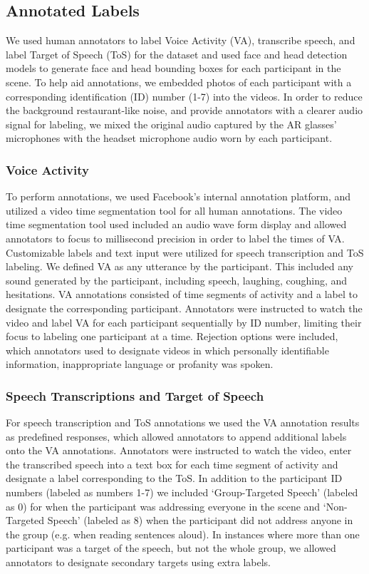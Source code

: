 \documentclass[journal]{IEEEtran}
\begin{document}
\subsection{Annotated Labels}
We used human annotators to label Voice Activity (VA), transcribe speech, and label Target of Speech (ToS) for the dataset and used face and head detection models to generate face and head bounding boxes for each participant in the scene.
To help aid annotations, we embedded photos of each participant with a corresponding identification (ID) number (1-7) into the videos.
In order to reduce the background restaurant-like noise, and provide annotators with a clearer audio signal for labeling, we mixed the original audio captured by the AR glasses' microphones with the headset microphone audio worn by each participant.



\subsubsection{Voice Activity}
To perform annotations, we used Facebook's internal annotation platform, and utilized a video time segmentation tool for all human annotations.
The video time segmentation tool used included an audio wave form display and allowed annotators to focus to millisecond precision in order to label the times of VA.
Customizable labels and text input were utilized for speech transcription and ToS labeling.
We defined VA as any utterance by the participant.
This included any sound generated by the participant, including speech, laughing, coughing, and hesitations.
VA annotations consisted of time segments of activity and a label to designate the corresponding participant.
Annotators were instructed to watch the video and label VA for each participant sequentially by ID number, limiting their focus to labeling one participant at a time.
Rejection options were included, which annotators used to designate videos in which personally identifiable information, inappropriate language or profanity was spoken.
 
 
\subsubsection{Speech Transcriptions and Target of Speech}
For speech transcription and ToS annotations we used the VA annotation results as predefined responses, which allowed annotators to append additional labels onto the VA annotations.
Annotators were instructed to watch the video, enter the transcribed speech into a text box for each time segment of activity and designate a label corresponding to the ToS.
In addition to the participant ID numbers (labeled as numbers 1-7) we included `Group-Targeted Speech' (labeled as 0) for when the participant was addressing everyone in the scene and `Non-Targeted Speech' (labeled as 8) when the participant did not address anyone in the group (e.g. when reading sentences aloud).
In instances where more than one participant was a target of the speech, but not the whole group, we allowed annotators to designate secondary targets using extra labels.
\end{document}
